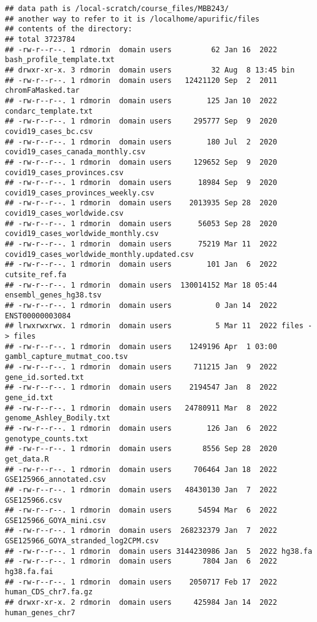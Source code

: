 \documentclass[
]{article}
\begin{document}
\begin{verbatim}
## data path is /local-scratch/course_files/MBB243/
## another way to refer to it is /localhome/apurific/files
## contents of the directory:
## total 3723784
## -rw-r--r--. 1 rdmorin  domain users         62 Jan 16  2022 bash_profile_template.txt
## drwxr-xr-x. 3 rdmorin  domain users         32 Aug  8 13:45 bin
## -rw-r--r--. 1 rdmorin  domain users   12421120 Sep  2  2011 chromFaMasked.tar
## -rw-r--r--. 1 rdmorin  domain users        125 Jan 10  2022 condarc_template.txt
## -rw-r--r--. 1 rdmorin  domain users     295777 Sep  9  2020 covid19_cases_bc.csv
## -rw-r--r--. 1 rdmorin  domain users        180 Jul  2  2020 covid19_cases_canada_monthly.csv
## -rw-r--r--. 1 rdmorin  domain users     129652 Sep  9  2020 covid19_cases_provinces.csv
## -rw-r--r--. 1 rdmorin  domain users      18984 Sep  9  2020 covid19_cases_provinces_weekly.csv
## -rw-r--r--. 1 rdmorin  domain users    2013935 Sep 28  2020 covid19_cases_worldwide.csv
## -rw-r--r--. 1 rdmorin  domain users      56053 Sep 28  2020 covid19_cases_worldwide_monthly.csv
## -rw-r--r--. 1 rdmorin  domain users      75219 Mar 11  2022 covid19_cases_worldwide_monthly.updated.csv
## -rw-r--r--. 1 rdmorin  domain users        101 Jan  6  2022 cutsite_ref.fa
## -rw-r--r--. 1 rdmorin  domain users  130014152 Mar 18 05:44 ensembl_genes_hg38.tsv
## -rw-r--r--. 1 rdmorin  domain users          0 Jan 14  2022 ENST00000003084
## lrwxrwxrwx. 1 rdmorin  domain users          5 Mar 11  2022 files -> files
## -rw-r--r--. 1 rdmorin  domain users    1249196 Apr  1 03:00 gambl_capture_mutmat_coo.tsv
## -rw-r--r--. 1 rdmorin  domain users     711215 Jan  9  2022 gene_id.sorted.txt
## -rw-r--r--. 1 rdmorin  domain users    2194547 Jan  8  2022 gene_id.txt
## -rw-r--r--. 1 rdmorin  domain users   24780911 Mar  8  2022 genome_Ashley_Bodily.txt
## -rw-r--r--. 1 rdmorin  domain users        126 Jan  6  2022 genotype_counts.txt
## -rw-r--r--. 1 rdmorin  domain users       8556 Sep 28  2020 get_data.R
## -rw-r--r--. 1 rdmorin  domain users     706464 Jan 18  2022 GSE125966_annotated.csv
## -rw-r--r--. 1 rdmorin  domain users   48430130 Jan  7  2022 GSE125966.csv
## -rw-r--r--. 1 rdmorin  domain users      54594 Mar  6  2022 GSE125966_GOYA_mini.csv
## -rw-r--r--. 1 rdmorin  domain users  268232379 Jan  7  2022 GSE125966_GOYA_stranded_log2CPM.csv
## -rw-r--r--. 1 rdmorin  domain users 3144230986 Jan  5  2022 hg38.fa
## -rw-r--r--. 1 rdmorin  domain users       7804 Jan  6  2022 hg38.fa.fai
## -rw-r--r--. 1 rdmorin  domain users    2050717 Feb 17  2022 human_CDS_chr7.fa.gz
## drwxr-xr-x. 2 rdmorin  domain users     425984 Jan 14  2022 human_genes_chr7

\end{verbatim}
\end{document}
